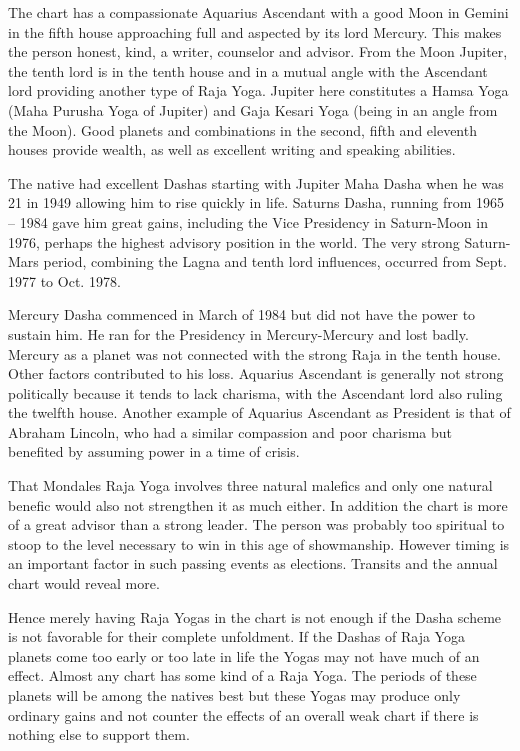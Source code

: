  

The chart has a compassionate Aquarius Ascendant with a good Moon in Gemini in the fifth house approaching full and aspected by its lord Mercury. This makes the person honest, kind, a writer, counselor and advisor. From the Moon Jupiter, the tenth lord is in the tenth house and in a mutual angle with the Ascendant lord providing another type of Raja Yoga. Jupiter here constitutes a Hamsa Yoga (Maha Purusha Yoga of Jupiter) and Gaja Kesari Yoga (being in an angle from the Moon). Good planets and combinations in the second, fifth and eleventh houses provide wealth, as well as excellent writing and speaking abilities.

 

The native had excellent Dashas starting with Jupiter Maha Dasha when he was 21 in 1949 allowing him to rise quickly in life. Saturns Dasha, running from 1965 – 1984 gave him great gains, including the Vice Presidency in Saturn-Moon in 1976, perhaps the highest advisory position in the world. The very strong Saturn-Mars period, combining the Lagna and tenth lord influences, occurred from Sept. 1977 to Oct. 1978.

 

Mercury Dasha commenced in March of 1984 but did not have the power to sustain him. He ran for the Presidency in Mercury-Mercury and lost badly. Mercury as a planet was not connected with the strong Raja in the tenth house. Other factors contributed to his loss. Aquarius Ascendant is generally not strong politically because it tends to lack charisma, with the Ascendant lord also ruling the twelfth house. Another example of Aquarius Ascendant as President is that of Abraham Lincoln, who had a similar compassion and poor charisma but benefited by assuming power in a time of crisis.

 

That Mondales Raja Yoga involves three natural malefics and only one natural benefic would also not strengthen it as much either. In addition the chart is more of a great advisor than a strong leader. The person was probably too spiritual to stoop to the level necessary to win in this age of showmanship. However timing is an important factor in such passing events as elections. Transits and the annual chart would reveal more.

 

Hence merely having Raja Yogas in the chart is not enough if the Dasha scheme is not favorable for their complete unfoldment. If the Dashas of Raja Yoga planets come too early or too late in life the Yogas may not have much of an effect. Almost any chart has some kind of a Raja Yoga. The periods of these planets will be among the natives best but these Yogas may produce only ordinary gains and not counter the effects of an overall weak chart if there is nothing else to support them.

